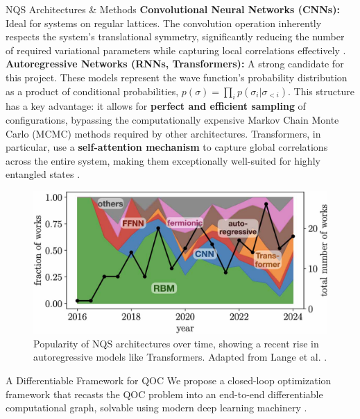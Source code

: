 \documentclass[final]{beamer}
\newlength{\colwidth}
\begin{document}
\begin{frame}[t]
\begin{columns}[t]
\begin{column}{\colwidth}
\begin{block}{NQS Architectures \& Methods}
    \textbf{Convolutional Neural Networks (CNNs):} Ideal for systems on regular lattices. The convolution operation inherently respects the system's translational symmetry, significantly reducing the number of required variational parameters while capturing local correlations effectively \cite{Lange2024Review}.\\[12px]
        
    \textbf{Autoregressive Networks (RNNs, Transformers):} A strong candidate for this project. These models represent the wave function's probability distribution as a product of conditional probabilities, $p(\sigma) = \prod_i p(\sigma_i | \sigma_{<i})$. This structure has a key advantage: it allows for \textbf{perfect and efficient sampling} of configurations, bypassing the computationally expensive Markov Chain Monte Carlo (MCMC) methods required by other architectures. Transformers, in particular, use a \textbf{self-attention mechanism} to capture global correlations across the entire system, making them exceptionally well-suited for highly entangled states \cite{Lange2024Review}.
    
    \begin{figure}
        \centering
        \includegraphics[width=0.3\paperwidth]{img/archtimes.jpg}
        \caption{Popularity of NQS architectures over time, showing a recent rise in autoregressive models like Transformers. Adapted from Lange et al. \cite{Lange2024Review}.}
    \end{figure}
\end{block}



  \begin{alertblock}{A Differentiable Framework for QOC}
    We propose a closed-loop optimization framework that recasts the QOC problem into an end-to-end differentiable computational graph, solvable using modern deep learning machinery \cite{Berni2025Proposal, Schaefer2020_diffprog}.
    

\end{alertblock}
\end{column}
\end{columns}
\end{frame}
\end{document}
